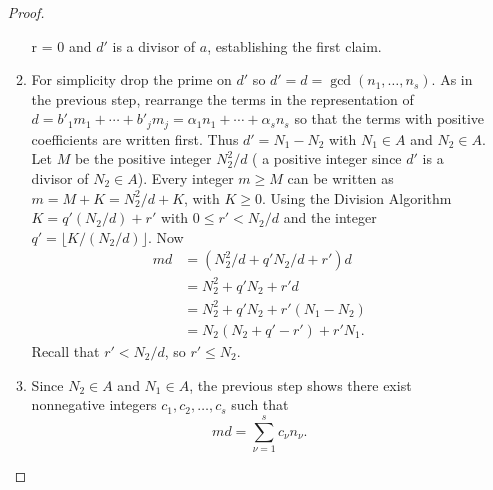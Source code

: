 \documentclass[12pt]{article}
\begin{document}
\begin{enumerate}
\begin{proof}
\begin{enumerate}
            r = 0 \) and \( d' \) is a divisor of \( a \), establishing
            the first claim.
        \item
          For simplicity drop the prime on \( d' \) so
          \( d' = d = \gcd(n_1, \dots, n_s) \).  As in the previous step,
            rearrange the terms in the representation of \( d = b'_1 m_1
            + \cdots + b'_j m_j = \alpha_1 n_1 + \cdots + \alpha_s n_s \) so that
            the terms with positive coefficients are written first.
            Thus \( d' = N_1 - N_2 \) with \( N_1 \in A \) and \( N_2 \in
            A \). Let \( M \) be the positive integer \( N_2^2/d \) (
            a positive integer since \( d' \) is a divisor of
            \(N_{2}\in A\)).
            Every integer \( m \ge M \) can be written as \( m = M + K =
            N_2^2/d + K \), with \( K \ge 0 \).  Using the Division
            Algorithm \( K = q' (N_2/d) + r' \) with \( 0 \le r' < N_2/d \)
            and the integer \( q' = \lfloor K/(N_2/d) \rfloor \).  Now
            \begin{align*}
              md &= (N_2^2/d + q' N_2/d + r') d \\
                 &= N_2^2 + q'N_2 + r'd \\
                 &= N_2^2 + q'N_2 + r'(N_1 - N_2) \\
                 &= N_2(N_2 + q' -r') + r' N_1.
            \end{align*}
            Recall that \( r' < N_2/d \), so \( r' \le N_2 \).
        \item
            Since \( N_2 \in A \) and \( N_1 \in A \), the previous
            step shows there exist
            nonnegative integers \( c_1, c_2, \dots, c_s \) such that
            \[
              md = \sum\limits_{\nu=1}^s c_\nu n_\nu.
            \]
    \end{enumerate}
\end{proof}


\end{enumerate}
\end{document}
